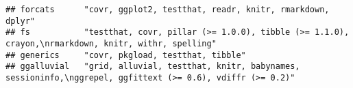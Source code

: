 \documentclass[]{book}
\begin{document}
\begin{verbatim}
## forcats      "covr, ggplot2, testthat, readr, knitr, rmarkdown, dplyr"                                                                                                                                                                                                                                                                                                                                                                                                                                                                                                                                                                                                                                                 
## fs           "testthat, covr, pillar (>= 1.0.0), tibble (>= 1.1.0), crayon,\nrmarkdown, knitr, withr, spelling"                                                                                                                                                                                                                                                                                                                                                                                                                                                                                                                                                                                                        
## generics     "covr, pkgload, testthat, tibble"                                                                                                                                                                                                                                                                                                                                                                                                                                                                                                                                                                                                                                                                         
## ggalluvial   "grid, alluvial, testthat, knitr, babynames, sessioninfo,\nggrepel, ggfittext (>= 0.6), vdiffr (>= 0.2)"                                                                                                                                                                                                                                                                                                                                                                                                                                                                                                                                                                                                  

\end{verbatim}
\end{document}
